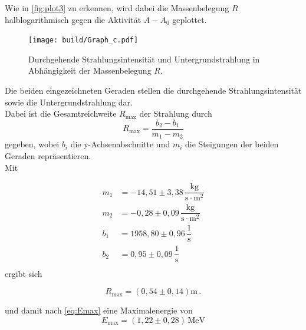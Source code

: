 Wie in \autoref{fig:plot3} zu erkennen, wird dabei die Massenbelegung $R$ halblogarithmisch gegen die Aktivität $A - A_0$ geplottet.
\begin{figure}[H]
    \centering
    \texttt{[image: build/Graph\_c.pdf]}
    \caption{Durchgehende Strahlungsintensität und Untergrundstrahlung in Abhängigkeit der Massenbelegung $R$.}
    \label{fig:plot3}
\end{figure}
Die beiden eingezeichneten Geraden stellen die durchgehende Strahlungsintensität sowie die Untergrundstrahlung dar. \\
Dabei ist die Gesamtreichweite $R_\text{max}$ der Strahlung durch
\begin{equation*}
    R_\text{max} = \frac{b_2 - b_1}{m_1 - m_2}
\end{equation*}
gegeben, wobei $b_i$ die y-Achsenabschnitte und $m_i$ die Steigungen der beiden Geraden repräsentieren. \\

Mit

\begin{align*}
    m_1 &= -14,51  \pm 3,38\,  \dfrac{\unit{\kilo\gram}}{\unit{\second \cdot \meter^2}}\\
    m_2 &= -0,28   \pm 0,09\,  \dfrac{\unit{\kilo\gram}}{\unit{\second \cdot \meter^2}}  \\
    b_1 &= 1958,80 \pm 0,96\,  \dfrac{1}{\unit{\second}}                         \\
    b_2 &= 0,95    \pm 0,09\,  \dfrac{1}{\unit{\second}}                          \\
\end{align*} ergibt sich

\begin{equation*}
    R_\text{max} = \left( 0,54 \pm 0,14 \right)  \unit{\meter} \,.
\end{equation*}

und damit nach \eqref{eq:Emax} eine Maximalenergie von
\begin{equation*}
    E_\text{max} = \left(1,22 \pm 0,28 \right) \, \unit{\mega\eV}
\end{equation*}


